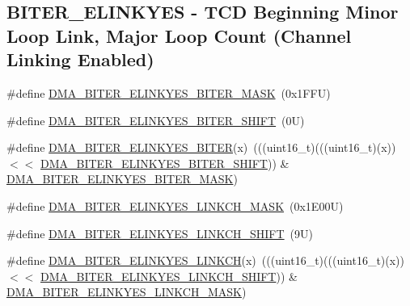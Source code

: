\subsection*{B\+I\+T\+E\+R\+\_\+\+E\+L\+I\+N\+K\+Y\+ES -\/ T\+CD Beginning Minor Loop Link, Major Loop Count (Channel Linking Enabled)}
\begin{DoxyCompactItemize}
\item 
\#define \mbox{\hyperlink{group___d_m_a___register___masks_ga6e5cea6df954df3bc7501c0074e7c52b}{D\+M\+A\+\_\+\+B\+I\+T\+E\+R\+\_\+\+E\+L\+I\+N\+K\+Y\+E\+S\+\_\+\+B\+I\+T\+E\+R\+\_\+\+M\+A\+SK}}~(0x1\+F\+F\+U)
\item 
\#define \mbox{\hyperlink{group___d_m_a___register___masks_ga6528aadc37f35d20d63354f8b755d11e}{D\+M\+A\+\_\+\+B\+I\+T\+E\+R\+\_\+\+E\+L\+I\+N\+K\+Y\+E\+S\+\_\+\+B\+I\+T\+E\+R\+\_\+\+S\+H\+I\+FT}}~(0\+U)
\item 
\#define \mbox{\hyperlink{group___d_m_a___register___masks_ga03d7581566df49ec66bd0f49c364ef6c}{D\+M\+A\+\_\+\+B\+I\+T\+E\+R\+\_\+\+E\+L\+I\+N\+K\+Y\+E\+S\+\_\+\+B\+I\+T\+ER}}(x)~(((uint16\+\_\+t)(((uint16\+\_\+t)(x)) $<$$<$ \mbox{\hyperlink{group___d_m_a___register___masks_ga6528aadc37f35d20d63354f8b755d11e}{D\+M\+A\+\_\+\+B\+I\+T\+E\+R\+\_\+\+E\+L\+I\+N\+K\+Y\+E\+S\+\_\+\+B\+I\+T\+E\+R\+\_\+\+S\+H\+I\+FT}})) \& \mbox{\hyperlink{group___d_m_a___register___masks_ga6e5cea6df954df3bc7501c0074e7c52b}{D\+M\+A\+\_\+\+B\+I\+T\+E\+R\+\_\+\+E\+L\+I\+N\+K\+Y\+E\+S\+\_\+\+B\+I\+T\+E\+R\+\_\+\+M\+A\+SK}})
\item 
\#define \mbox{\hyperlink{group___d_m_a___register___masks_gaae29d9573a40f548fb59ef26557d43df}{D\+M\+A\+\_\+\+B\+I\+T\+E\+R\+\_\+\+E\+L\+I\+N\+K\+Y\+E\+S\+\_\+\+L\+I\+N\+K\+C\+H\+\_\+\+M\+A\+SK}}~(0x1\+E00\+U)
\item 
\#define \mbox{\hyperlink{group___d_m_a___register___masks_gac10d4afb5b6f8caa42e7ef897b700cd6}{D\+M\+A\+\_\+\+B\+I\+T\+E\+R\+\_\+\+E\+L\+I\+N\+K\+Y\+E\+S\+\_\+\+L\+I\+N\+K\+C\+H\+\_\+\+S\+H\+I\+FT}}~(9\+U)
\item 
\#define \mbox{\hyperlink{group___d_m_a___register___masks_ga90c0049ad1dc4dc1ea3f546e4cf6ccf8}{D\+M\+A\+\_\+\+B\+I\+T\+E\+R\+\_\+\+E\+L\+I\+N\+K\+Y\+E\+S\+\_\+\+L\+I\+N\+K\+CH}}(x)~(((uint16\+\_\+t)(((uint16\+\_\+t)(x)) $<$$<$ \mbox{\hyperlink{group___d_m_a___register___masks_gac10d4afb5b6f8caa42e7ef897b700cd6}{D\+M\+A\+\_\+\+B\+I\+T\+E\+R\+\_\+\+E\+L\+I\+N\+K\+Y\+E\+S\+\_\+\+L\+I\+N\+K\+C\+H\+\_\+\+S\+H\+I\+FT}})) \& \mbox{\hyperlink{group___d_m_a___register___masks_gaae29d9573a40f548fb59ef26557d43df}{D\+M\+A\+\_\+\+B\+I\+T\+E\+R\+\_\+\+E\+L\+I\+N\+K\+Y\+E\+S\+\_\+\+L\+I\+N\+K\+C\+H\+\_\+\+M\+A\+SK}})

\end{DoxyCompactItemize}
